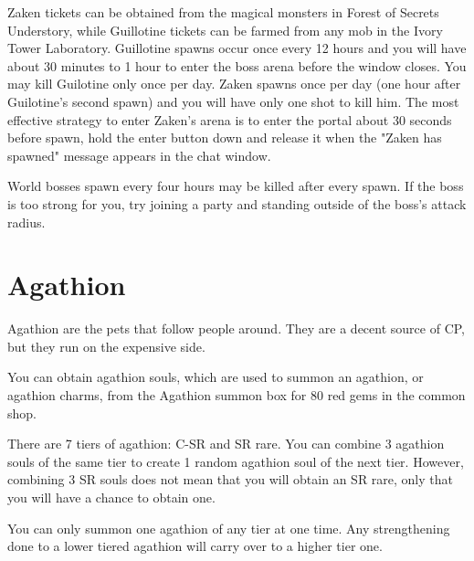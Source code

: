 \documentclass[]{article}
\begin{document}
Zaken tickets can be obtained from the magical monsters in Forest of Secrets Understory, while Guillotine tickets can be farmed from any mob in the Ivory Tower Laboratory. 
Guillotine spawns occur once every 12 hours and you will have about 30 minutes to 1 hour to enter the boss arena before the window closes.
You may kill Guilotine only once per day.
Zaken spawns once per day (one hour after Guilotine's second spawn) and you will have only one shot to kill him.
The most effective strategy to enter Zaken's arena is to enter the portal about 30 seconds before spawn, hold the enter button down and release it when the "Zaken has spawned" message appears in the chat window.


World bosses spawn every four hours may be killed after every spawn.
If the boss is too strong for you, try joining a party and standing outside of the boss's attack radius.

\pagebreak
\section{Agathion}
Agathion are the pets that follow people around.
They are a decent source of CP, but they run on the expensive side.

You can obtain agathion souls, which are used to summon an agathion, or agathion charms, from the Agathion summon box for 80 red gems in the common shop. 

There are 7 tiers of agathion: C-SR and SR rare.
You can combine 3 agathion souls of the same tier to create 1 random agathion soul of the next tier.
However, combining 3 SR souls does not mean that you will obtain an SR rare, only that you will have a chance to obtain one.

You can only summon one agathion of any tier at one time.
Any strengthening done to a lower tiered agathion will carry over to a higher tier one.
\end{document}
